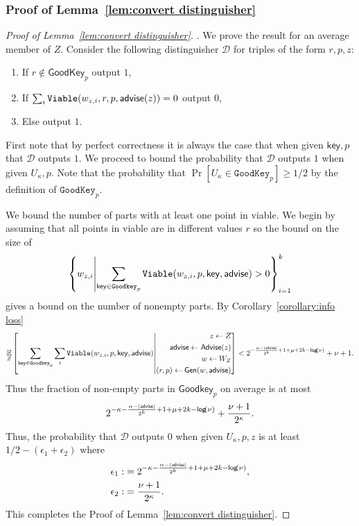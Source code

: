 \subsubsection{Proof of Lemma~\ref{lem:convert distinguisher}}

\begin{proof}[Proof of Lemma~\ref{lem:convert distinguisher}].
We prove the result for an average member of $Z$.
Consider the following distinguisher $\mathcal{D}$ for triples of the form $r, p, z$:
\begin{enumerate}
\item If $r \not\in \mathsf{GoodKey}_p$ output $1$,
\item If $\sum_{i} \mathtt{Viable}(w_{z, i}, r, p, {\mathsf{advise}}(z)) =0 $ output $0$,
\item Else output $1$.
\end{enumerate}
First note that by perfect correctness it is always the case that when given $\mathsf{key}, p$ that $\mathcal{D}$ outputs $1$.  We proceed to bound the probability that $\mathcal{D}$ outputs $1$ when given $U_\kappa, p$.  Note that the probability that $\Pr[U_\kappa \in \mathtt{GoodKey}_p] \ge 1/2$ by the definition of $\mathtt{GoodKey}_p$. 

We bound the number of parts with at least one point in viable.  We begin by assuming that all points in viable are in different  values $r$ so the bound on the size of 
\[
\left\{w_{z, i} \middle|\sum_{\mathsf{key}\in\mathtt{Goodkey}_p} \mathtt{Viable}(w_{z,i}, p, \mathsf{key}, {\mathsf{advise}})>0\right\}_{i=1}^k 
\] 
gives a bound on the number of nonempty parts. By Corollary~\ref{corollary:info loss} 
\[
\operatorname*{\mathbb{E}}_{Z} \left[\sum_{\mathsf{key} \in \mathtt{Goodkey}_p}\sum_{i }  \mathtt{Viable}(w_{z,i}, p, \mathsf{key}, {\mathsf{advise}}) \middle| \begin{aligned} z\leftarrow Z\\ {\mathsf{advise}}\leftarrow {\ensuremath{\mathsf{Advise}}}(z)\\w\leftarrow W_Z\\(r, p)\leftarrow {\ensuremath{\mathsf{Gen}}}(w, {\mathsf{advise}})\end{aligned} \right]< 2^{-\frac{\alpha-|{\mathsf{advise}}|}{2^k}+1+\mu+2k-\mathsf{log}\!\left(\nu\right)}+\nu+1.
\]
Thus the fraction of non-empty parts in $\mathsf{Goodkey}_p$ on average is at most 
\[
2^{-\kappa-\frac{\alpha-|{\mathsf{advise}}|}{2^k}+1+\mu+2k-\mathsf{log}\!\left(\nu\right)}+\frac{\nu+1}{2^\kappa}.
\]
Thus, the probability that $\mathcal{D}$ outputs $0$ when given $U_\kappa, p, z$ is at least 
$1/2-(\epsilon_1+\epsilon_2)$
where 
\begin{align*}
\epsilon_1:&=2^{-\kappa-\frac{\alpha-|{\mathsf{advise}}|}{2^k}+1+\mu+2k-\mathsf{log}\!\left(\nu\right)},\\
\epsilon_2:&=\frac{\nu+1}{2^{\kappa}}.
\end{align*}
\noindent
This completes the Proof of Lemma~\ref{lem:convert distinguisher}.
\end{proof}

